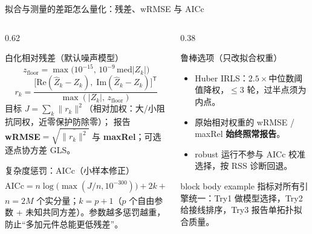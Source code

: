 \documentclass[UTF8,aspectratio=169,10pt]{ctexbeamer}
\begin{document}
\begin{frame}{拟合与测量的差距怎么量化：残差、wRMSE 与 AICc}
  \begin{columns}
    \begin{column}{0.62\textwidth}
      \begin{block}{白化相对残差（默认噪声模型）}
        {\small
        \[
          z_{\mathrm{floor}}=\max\!\bigl(10^{-15},\,10^{-9}\,\mathrm{med}|Z_k|\bigr)
        \]
        \[
          r_k=\frac{\bigl[\mathrm{Re}(\hat Z_k-Z_k),\;\mathrm{Im}(\hat Z_k-Z_k)\bigr]^{\mathsf T}}{\max(|Z_k|,\,z_{\mathrm{floor}})}
        \]}
        目标 $J=\sum_k\|r_k\|^2$（相对加权：大/小阻抗同权，近零保护防除零）；
        报告 \textbf{wRMSE}$=\sqrt{\overline{\|r_k\|^2}}$ 与 \textbf{maxRel}；可选逐点协方差 GLS。
      \end{block}
      \begin{block}{复杂度惩罚：AICc（小样本修正）}
        {\small
        \[
          \mathrm{AICc}=n\log\!\bigl(\max(J/n,10^{-300})\bigr)+2k+\frac{2k(k+1)}{n-k-1}
        \]}
        $n=2M$ 个实分量；$k=p+1$（$p$ 个自由参数 + 未知共同方差）。参数越多惩罚越重，防止“多加元件总能更低残差”。
      \end{block}
    \end{column}
    \begin{column}{0.38\textwidth}
      \begin{block}{鲁棒选项（只改拟合权重）}
        \begin{itemize}
          \item Huber IRLS：$2.5\times$中位数阈值降权，$\le 3$ 轮，过半点须为内点。
          \item 原始相对权重的 wRMSE / maxRel \textbf{始终照常报告}。
          \item robust 运行不参与 AICc 校准选择，按 RSS 诊断回退。
        \end{itemize}
      \end{block}
      \vspace{0.8ex}
      \begin{beamercolorbox}[sep=4pt]{block body example}
        指标对所有引擎统一：Try1 做模型选择，Try2 给接线排序，Try3 报告单拓扑拟合质量。
      \end{beamercolorbox}
    \end{column}
  \end{columns}
\end{frame}
\end{document}

